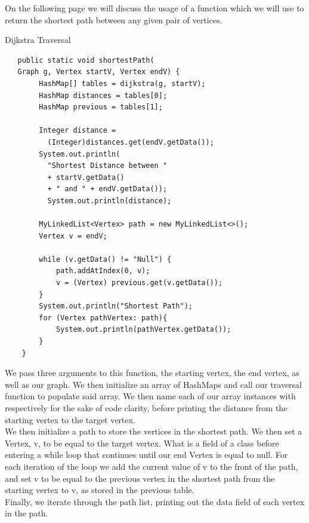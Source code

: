 \documentclass[a4paper]{article}
\begin{document}
On the following page we will discuss the usage of a function which we will use 
to return the shortest path between any given pair of vertices. 

\newpage


\begin{algorithm}
\caption{Dijkstra Traversal}\label{euclid}

\begin{verbatim}
   public static void shortestPath(
   Graph g, Vertex startV, Vertex endV) {
        HashMap[] tables = dijkstra(g, startV);
        HashMap distances = tables[0];
        HashMap previous = tables[1];

        Integer distance =
          (Integer)distances.get(endV.getData());
        System.out.println(
          "Shortest Distance between "
          + startV.getData()
          + " and " + endV.getData());
          System.out.println(distance);

        MyLinkedList<Vertex> path = new MyLinkedList<>();
        Vertex v = endV;

        while (v.getData() != "Null") {
            path.addAtIndex(0, v);
            v = (Vertex) previous.get(v.getData());
        }
        System.out.println("Shortest Path");
        for (Vertex pathVertex: path){
            System.out.println(pathVertex.getData());
        }
    }
\end{verbatim}
\end{algorithm}


\vspace{6mm}
We pass three arguments to this function,
the starting vertex, the end vertex, as well as our graph.
We then initialize an array of HashMaps and call our traversal function to populate said array.
We then name each of our array instances with respectively for the sake of code clarity,
before printing the distance from the starting vertex to the target vertex. \\

We then initialize a path to store the vertices in the shortest path.
We then set a Vertex, v, to be equal to the target vertex. What is a field of a class
before entering a while loop that continues until our end Vertex is equal to null.
For each iteration of the loop we add the current value of v to the front of the path, 
and set v to be equal to the previous vertex in the shortest path from the starting vertex to v, as stored in the previous table. \\

Finally, we iterate through the path list, printing out the data field of each vertex in the path.
\end{document}
